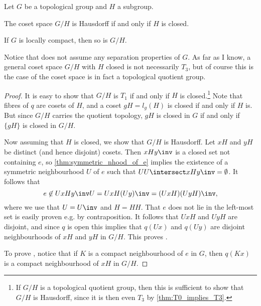 \documentclass[article, a4paper, 11pt, oneside]{memoir}
\numberwithin{equation}{chapter}
\begin{document}
\begin{proposition}
    Let $G$ be a topological group and $H$ a subgroup.
    \begin{enumprop}
        \item \label{enum:coset_space_hausdorff} The coset space $G/H$ is Hausdorff if and only if $H$ is closed.
        
        \item \label{enum:coset_space_locally_compact} If $G$ is locally compact\footnotemark, then so is $G/H$.
    \end{enumprop}
\end{proposition}
%
Notice that  does not assume any separation properties of $G$. As far as I know, a general coset space $G/H$ with $H$ closed is not necessarily $T_3$, but of course this is the case of the coset space is in fact a topological quotient group.

\begin{proof}
    It is easy to show that $G/H$ is $T_1$ if and only if $H$ is closed.\footnote{If $G/H$ is a topological quotient group, then this is sufficient to show that $G/H$ is Hausdorff, since it is then even $T_3$ by \cref{thm:T0_implies_T3}.} Note that fibres of $q$ are cosets of $H$, and a coset $gH = l_g(H)$ is closed if and only if $H$ is. But since $G/H$ carries the quotient topology, $gH$ is closed in $G$ if and only if $\{gH\}$ is closed in $G/H$.

    Now assuming that $H$ is closed, we show that $G/H$ is Hausdorff. Let $xH$ and $yH$ be distinct (and hence disjoint) cosets. Then $xHy\inv$ is a closed set not containing $e$, so \cref{thm:symmetric_nhood_of_e} implies the existence of a symmetric neighbourhood $U$ of $e$ such that $UU \intersect xHy\inv = \emptyset$. It follows that
    \begin{equation*}
        e
            \not\in U xHy\inv U
            = Ux H (Uy)\inv
            = (UxH)(UyH)\inv,
    \end{equation*}
    where we use that $U = U\inv$ and $H = HH$. That $e$ does not lie in the left-most set is easily proven e.g. by contraposition. It follows that $UxH$ and $UyH$ are disjoint, and since $q$ is open this implies that $q(Ux)$ and $q(Uy)$ are disjoint neighbourhoods of $xH$ and $yH$ in $G/H$. This proves .

    To prove , notice that if $K$ is a compact neighbourhood of $e$ in $G$, then $q(Kx)$ is a compact neighbourhood of $xH$ in $G/H$.
\end{proof}
\end{document}
